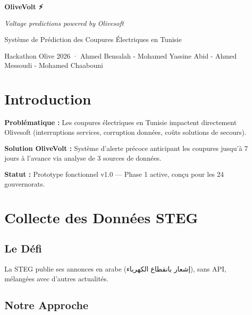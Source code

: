 \documentclass[10pt,a4paper]{article}
\begin{document}
\begin{center}
\vspace*{-1cm}
{\Large\bfseries\color{olivegreen} OliveVolt {\symbolfont ⚡}}\par
\vspace{0.05cm}
{\small\itshape Voltage predictions powered by Olivesoft}\par
\vspace{0.1cm}
{\normalsize Système de Prédiction des Coupures Électriques en Tunisie}\par
\vspace{0.05cm}
{\footnotesize Hackathon Olive 2026 · Ahmed Bensalah - Mohamed Yassine Abid - Ahmed Messoudi - Mohamed Chaabouni}\par
\end{center}
\vspace{0.1cm}

\section*{Introduction}
\vspace{-2pt}

\textbf{Problématique :} Les coupures électriques en Tunisie impactent directement Olivesoft (interruptions services, corruption données, coûts solutions de secours).

\textbf{Solution OliveVolt :} Système d'alerte précoce anticipant les coupures jusqu'à 7 jours à l'avance via analyse de 3 sources de données.

\textbf{Statut :} Prototype fonctionnel v1.0 — Phase 1 active, conçu pour les 24 gouvernorats.

\section{Collecte des Données STEG}
\vspace{-2pt}

\subsection*{Le Défi}
La STEG publie ses annonces en arabe (\textarabic{إشعار بانقطاع الكهرباء}), sans API, mélangées avec d'autres actualités.

\subsection*{Notre Approche}
\end{document}

